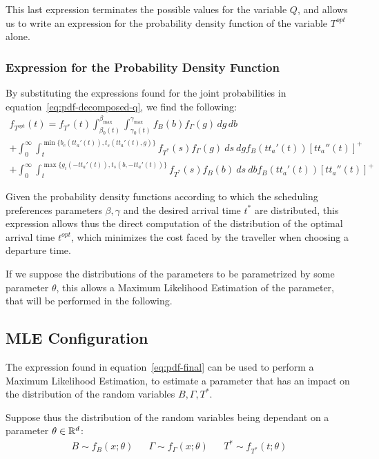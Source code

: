 This last expression terminates the possible values for the variable \(Q\),
and allows us to write an expression for the probability density function of the variable \(T^{opt}\) alone.

\subsubsection{Expression for the Probability Density Function}

By substituting the expressions found for the joint probabilities in equation~\eqref{eq:pdf-decomposed-q},
we find the following:
\begin{multline}
  \label{eq:pdf-final}
    f_{T^{opt}}(t) = f_{T^*}(t)\int_{\beta_0(t)}^{\beta_{\text{max}}}\int_{\gamma_0(t)}^{\gamma_{\text{max}}}f_B(b)f_\Gamma(g)\, dg\, db \\
    + \int_0^\infty \int_t^{\min\{b_e(tt_a'(t)), t_s(tt_a'(t), g)\}}f_{T^*}(s) f_\Gamma(g)\ ds\ dg f_B(tt_a'(t)) [tt_a''(t)]^+ \\
    + \int_0^\infty \int_t^{\max\{g_i(-tt_a'(t)), t_s(b, -tt_a'(t))\}}f_{T^*}(s) f_B(b)\ ds\ db f_B(tt_a'(t)) [tt_a''(t)]^+
\end{multline}

Given the probability density functions according to which the scheduling preferences parameters \(\beta, \gamma\) and the desired arrival time \(t^*\) are distributed,
this expression allows thus the direct computation of the distribution of the optimal arrival time \(t^{opt}\),
which minimizes the cost faced by the traveller when choosing a departure time.

If we suppose the distributions of the parameters to be parametrized by some parameter \(\theta\),
this allows a Maximum Likelihood Estimation of the parameter,
that will be performed in the following.

\subsection{MLE Configuration}

The expression found in equation~\eqref{eq:pdf-final} can be used to perform a Maximum Likelihood Estimation,
to estimate a parameter that has an impact on the distribution of the random variables \(B, \Gamma, T^*\).

Suppose thus the distribution of the random variables being dependant on a parameter \(\theta \in \mathbb{R}^d\):
\begin{align*}
  B \sim f_B(x; \theta) && \Gamma \sim f_\Gamma(x; \theta) && T^* \sim f_{T^*}(t; \theta)
\end{align*}

